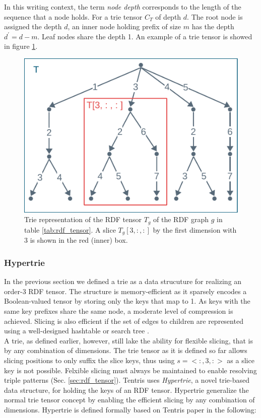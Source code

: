 In this writing context, the term \textit{node depth} corresponds to the length of the sequence that a node holds. For a trie tensor $C_T$ of depth $d$. The root node is assigned the depth $d$, an inner node holding prefix of size $m$ has the depth $d^{'}=d-m$. Leaf nodes share the depth 1. An example of a trie tensor is showed in figure \ref{fig:rdf_trie}.  \\

\begin{figure}[h]
	\centering
	\includegraphics{figures/chapter2/trie4}
	\caption{Trie representation of the RDF tensor $T_g$ of the RDF graph $g$ in table \ref{tab:rdf_tensor}. A slice $T_g[3, :, :]$ by the first dimension with 3 is shown in the red (inner) box.}
	\label{fig:rdf_trie}
\end{figure}
\clearpage


\subsubsection{Hypertrie}
\label{sec:hypertrie_pre}
In the previous section we defined a trie as a data strucuture for realizing an order-3 RDF tensor. The structure is memory-efficient as it sparsely encodes a Boolean-valued tensor by storing only the keys that map to 1. As keys with the same key prefixes share the same node, a moderate level of compression is achieved. Slicing is also efficient if the set of edges to children are represented using a well-designed hashtable or search tree \cite{Brass:2008:ADS:1434862}. \\

A trie, as defined earlier, however, still lake the ability for flexible slicing, that is by any combination of dimensions. The trie tensor as it is defined so far allows slicing positions to only suffix the slice keys, thus using $s = <:, 3, :>$ as a slice key is not possible. Felxible slicing must always be maintained to enable resolving triple patterns (Sec. \ref{sec:rdf_tensor}). Tentris uses \textit{Hypertrie}, a novel trie-based data structure, for holding the keys of an RDF tensor. Hypertrie generalize the normal trie tensor concept by enabling the efficient slicing by any combination of dimensions. Hypertrie is defined formally based on Tentris paper \cite{tentris2020} in the following:\\

